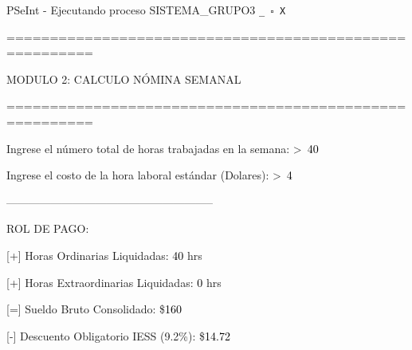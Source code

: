 \documentclass[12pt,a4paper]{article}
\newcommand{\consola}[1]{\noindent\textcolor{pseString}{#1}}
\newcommand{\entrada}[1]{\textcolor{black}{#1}}
\newenvironment{PSeIntWindow}{%
	\begin{tcolorbox}[
		breakable,
		enhanced,
		colback=white,
		colframe=black!60,
		boxrule=0.5pt,
		arc=1mm,
		left=0mm,
		right=0mm,
		top=0mm,
		bottom=2mm,
		width=\textwidth
		]
	}{%
	\end{tcolorbox}
}
\newcommand{\BarraPSeInt}{%
	\colorbox{gray!20}{%
		\parbox{\dimexpr\textwidth-2\fboxsep\relax}{%
			\small
			\textcolor{pseString}{\faPlayCircle}
			\hspace{0.3em}
			PSeInt - Ejecutando proceso SISTEMA\_GRUPO3
			\hfill
			\texttt{\_ \hspace{0.5em} \(\square\) \hspace{0.5em} X}
		}
	}
}
\begin{document}
	\begin{PSeIntWindow}
		
		\BarraPSeInt
		
		\vspace{0.2cm}
		
		\ttfamily
		\small
		
		\consola{========================================================}\par
		
		\begin{center}
			\textcolor{pseString}{MODULO 2: CALCULO NÓMINA SEMANAL}
		\end{center}
		
		\consola{========================================================}\par
		
		\vspace{0.3cm}
		
		\consola{Ingrese el número total de horas trabajadas en la semana: \textgreater\ }\entrada{40}\par
		
		\consola{Ingrese el costo de la hora laboral estándar (Dolares): \textgreater\ }\entrada{4}\par
		
		\vspace{0.3cm}
		
		\consola{--------------------------------------------------------}\par
		
		\vspace{0.2cm}
		
		\consola{ROL DE PAGO:}\par
		
		\vspace{0.2cm}
		
		\consola{\hspace*{0.5cm}[+] Horas Ordinarias Liquidadas: }\entrada{40}\consola{ hrs}\par
		
		\consola{\hspace*{0.5cm}[+] Horas Extraordinarias Liquidadas: }\entrada{0}\consola{ hrs}\par
		
		\consola{\hspace*{0.5cm}[=] Sueldo Bruto Consolidado: \$}\entrada{160}\par
		
		\consola{\hspace*{0.5cm}[-] Descuento Obligatorio IESS (9.2\%): \$}\entrada{14.72}\par
		

\end{PSeIntWindow}
\end{document}
